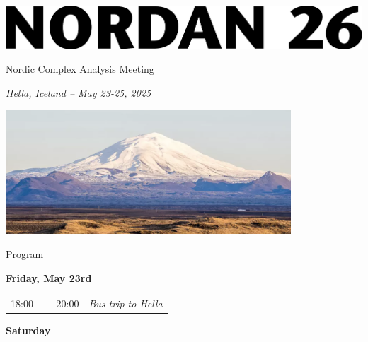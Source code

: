 \documentclass[12pt, openany, twoside]{report}      %
\def\SUBTITLE{Nordic Complex Analysis Meeting}
\def\LOCATION{Hella, Iceland -- May 23-25, 2025}
\begin{document}
\begin{titlepage}
    \centering
    \includegraphics[scale = 0.45]{figs/title} \\
    \vspace{0.5cm}
    {\Huge \textrm{\SUBTITLE}\par}
    \vspace{0.5cm}
    {\Large \textsl{\LOCATION}\par}
    \vspace{2cm}
    \vfill
    \vfill
    \vfill
    \includegraphics[width=0.8\textwidth]{figs/cover_crop}\par\vspace{1cm}
    \vfill
    \vfill
\end{titlepage}

\newpage
\thispagestyle{empty}
\begin{center} 
    \noindent{}
\end{center}
    
\vfill


\pagebreak
\renewcommand{\arraystretch}{1.2}

\noindent
{\LARGE Program}

\bigskip
\bigskip
\noindent
\textbf{\large Friday, May 23rd}
\smallskip

\noindent
\begin{tabular}{l@{\ } l@{\ } l l}
18:00 & - & 20:00 & \textit{Bus trip to Hella}
\end{tabular}

\bigskip
\noindent
\textbf{\large Saturday}
\smallskip
\end{document}
